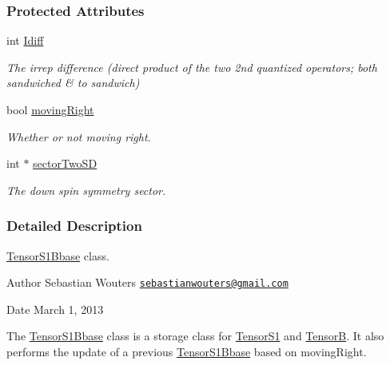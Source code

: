 \subsubsection*{Protected Attributes}
\begin{DoxyCompactItemize}
\item 
\hypertarget{classCheMPS2_1_1TensorS1Bbase_af77f62989428f0422daca1f8070b779a}{int \hyperlink{classCheMPS2_1_1TensorS1Bbase_af77f62989428f0422daca1f8070b779a}{Idiff}}\label{classCheMPS2_1_1TensorS1Bbase_af77f62989428f0422daca1f8070b779a}

\begin{DoxyCompactList}\small\item\em The irrep difference (direct product of the two 2nd quantized operators; both sandwiched \& to sandwich) \end{DoxyCompactList}\item 
\hypertarget{classCheMPS2_1_1TensorS1Bbase_a5229d6944904b2fe8ae51901ce7a094d}{bool \hyperlink{classCheMPS2_1_1TensorS1Bbase_a5229d6944904b2fe8ae51901ce7a094d}{moving\-Right}}\label{classCheMPS2_1_1TensorS1Bbase_a5229d6944904b2fe8ae51901ce7a094d}

\begin{DoxyCompactList}\small\item\em Whether or not moving right. \end{DoxyCompactList}\item 
\hypertarget{classCheMPS2_1_1TensorS1Bbase_a10a249b9fadf061c453623a2cb97e114}{int $\ast$ \hyperlink{classCheMPS2_1_1TensorS1Bbase_a10a249b9fadf061c453623a2cb97e114}{sector\-Two\-S\-D}}\label{classCheMPS2_1_1TensorS1Bbase_a10a249b9fadf061c453623a2cb97e114}

\begin{DoxyCompactList}\small\item\em The down spin symmetry sector. \end{DoxyCompactList}\end{DoxyCompactItemize}


\subsubsection{Detailed Description}
\hyperlink{classCheMPS2_1_1TensorS1Bbase}{Tensor\-S1\-Bbase} class. \begin{DoxyAuthor}{Author}
Sebastian Wouters \href{mailto:sebastianwouters@gmail.com}{\tt sebastianwouters@gmail.\-com} 
\end{DoxyAuthor}
\begin{DoxyDate}{Date}
March 1, 2013
\end{DoxyDate}
The \hyperlink{classCheMPS2_1_1TensorS1Bbase}{Tensor\-S1\-Bbase} class is a storage class for \hyperlink{classCheMPS2_1_1TensorS1}{Tensor\-S1} and \hyperlink{classCheMPS2_1_1TensorB}{Tensor\-B}. It also performs the update of a previous \hyperlink{classCheMPS2_1_1TensorS1Bbase}{Tensor\-S1\-Bbase} based on moving\-Right. 

